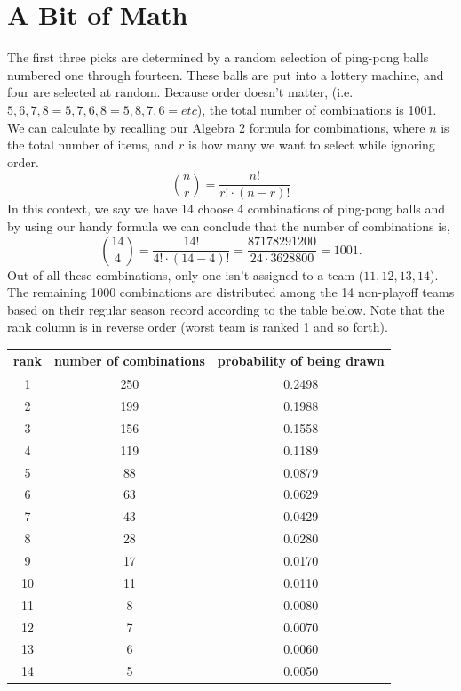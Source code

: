 \documentclass[letterpaper,12pt]{article}
\begin{document}
\section{A Bit of Math}
The first three picks are determined by a random selection of ping-pong balls numbered one through fourteen.  These balls are put into a lottery machine, and four are selected at random. Because order doesn't matter, (i.e. $5,6,7,8 = 5,7,6,8 = 5,8,7,6 = etc$), the total number of combinations is 1001. We can calculate by recalling our Algebra 2 formula for combinations, where $n$ is the total number of items, and $r$ is how many we want to select while ignoring order. 
$$ \binom{n}{r} = \frac{n!}{r!\cdot(n-r)!}$$ \newpage
In this context, we say we have 14 choose 4 combinations of ping-pong balls and by using our handy formula we can conclude that the number of combinations is,
$$\binom{14}{4} = \frac{14!}{4!\cdot(14-4)!} = \frac{87178291200}{24 \cdot 3628800} = 1001.$$
Out of all these combinations, only one isn't assigned to a team ($11,12,13,14$). The remaining 1000 combinations are distributed among the 14 non-playoff teams based on their regular season record according to the table below. Note that the rank column is in reverse order (worst team is ranked 1 and so forth). 

\begin{center}
\begin{tabular}{ |c|c|c| }
 \hline
 rank & number of combinations & probability of being drawn \\ 
 \hline
 1 & 250 & 0.2498 \\ 
 2 & 199 & 0.1988 \\ 
 3 & 156 & 0.1558 \\ 
 4 & 119 & 0.1189 \\ 
 5 & 88 & 0.0879 \\ 
 6 & 63 & 0.0629 \\ 
 7 & 43 & 0.0429 \\ 
 8 & 28 & 0.0280 \\ 
 9 & 17 & 0.0170 \\ 
 10 & 11 & 0.0110 \\ 
 11 & 8 & 0.0080 \\ 
 12 & 7 & 0.0070 \\ 
 13 & 6 & 0.0060 \\ 
 14 & 5 & 0.0050 \\ 
 \hline
\end{tabular}
\end{center}
\end{document}

